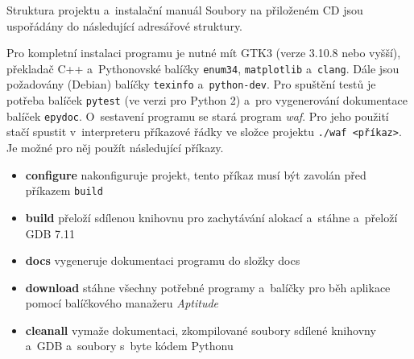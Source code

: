 \documentclass[czech,bachelor,male,python,dept460,hidelinks]{diploma}						%
\newcommand{\parspace}[1][]{
	\ifthenelse{\isempty{#1}}{\vspace{0mm}}{\vspace{#1}}
	\par
}
\begin{document}
\appendix
\begin{section}{Struktura projektu a~instalační manuál}
\label{appendix:manual}
	Soubory na přiloženém CD jsou uspořádány do následující adresářové struktury.
	
	\vspace{5mm}
	
	
	\parspace Pro kompletní instalaci programu je nutné mít GTK3 (verze 3.10.8 nebo vyšší), překladač C++ a~Pythonovské balíčky \texttt{enum34},
	\texttt{matplotlib} a~\texttt{clang}. Dále jsou požadovány (Debian) balíčky \texttt{texinfo} a~\texttt{python-dev}.
	Pro spuštění testů je potřeba balíček \texttt{pytest} (ve verzi pro Python 2)
	a~pro vygenerování dokumentace balíček \texttt{epydoc}. O~sestavení programu se stará program \textit{waf}. Pro jeho použití stačí spustit v~interpreteru
	příkazové řádky ve složce projektu \texttt{./waf <příkaz>}. Je možné pro něj použít následující příkazy.
	
	\begin{itemize}
		\item \textbf{configure} nakonfiguruje projekt, tento příkaz musí být zavolán před příkazem \texttt{build}
		\item \textbf{build} přeloží sdílenou knihovnu pro zachytávání alokací a~stáhne a~přeloží GDB 7.11
		\item \textbf{docs} vygeneruje dokumentaci programu do složky docs
		\item \textbf{download} stáhne všechny potřebné programy a~balíčky pro běh aplikace pomocí balíčkového manažeru \textit{Aptitude}
		\item \textbf{cleanall} vymaže dokumentaci, zkompilované soubory sdílené knihovny a~GDB a~soubory s~byte kódem Pythonu
	\end{itemize}
	

\end{section}
\end{document}
